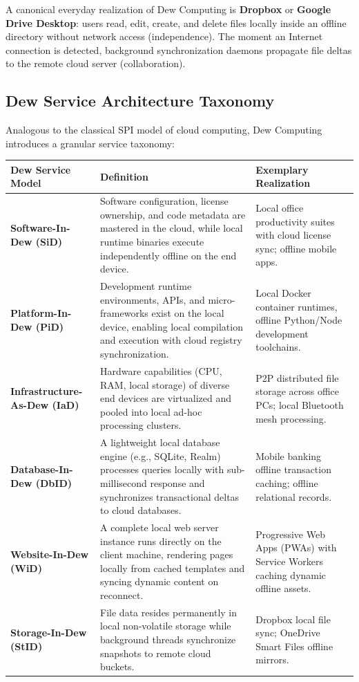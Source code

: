 \documentclass[11pt,a4paper,openany]{report}
\begin{document}
A canonical everyday realization of Dew Computing is \textbf{Dropbox} or \textbf{Google Drive Desktop}: users read, edit, create, and delete files locally inside an offline directory without network access (independence). The moment an Internet connection is detected, background synchronization daemons propagate file deltas to the remote cloud server (collaboration).

\subsection{Dew Service Architecture Taxonomy}
Analogous to the classical SPI model of cloud computing, Dew Computing introduces a granular service taxonomy:
\begin{center}
\begin{tabularx}{\textwidth}{>{\bfseries}l X X}
\toprule
Dew Service Model & Definition & Exemplary Realization\\
\midrule
Software-In-Dew (SiD) & Software configuration, license ownership, and code metadata are mastered in the cloud, while local runtime binaries execute independently offline on the end device. & Local office productivity suites with cloud license sync; offline mobile apps.\\
\addlinespace
Platform-In-Dew (PiD) & Development runtime environments, APIs, and micro-frameworks exist on the local device, enabling local compilation and execution with cloud registry synchronization. & Local Docker container runtimes, offline Python/Node development toolchains.\\
\addlinespace
Infrastructure-As-Dew (IaD) & Hardware capabilities (CPU, RAM, local storage) of diverse end devices are virtualized and pooled into local ad-hoc processing clusters. & P2P distributed file storage across office PCs; local Bluetooth mesh processing.\\
\addlinespace
Database-In-Dew (DbID) & A lightweight local database engine (e.g., SQLite, Realm) processes queries locally with sub-millisecond response and synchronizes transactional deltas to cloud databases. & Mobile banking offline transaction caching; offline relational records.\\
\addlinespace
Website-In-Dew (WiD) & A complete local web server instance runs directly on the client machine, rendering pages locally from cached templates and syncing dynamic content on reconnect. & Progressive Web Apps (PWAs) with Service Workers caching dynamic offline assets.\\
\addlinespace
Storage-In-Dew (StID) & File data resides permanently in local non-volatile storage while background threads synchronize snapshots to remote cloud buckets. & Dropbox local file sync; OneDrive Smart Files offline mirrors.\\
\bottomrule
\end{tabularx}
\end{center}
\end{document}
